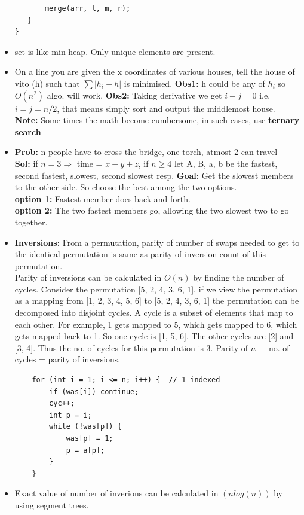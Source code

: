 \documentclass[8pt, a4paper, oneside, twocolumn]{extarticle}
\begin{document}
\begin{itemize}
\begin{verbatim}
       merge(arr, l, m, r);
   }
}
    \end{verbatim}
    \item set is like min heap. Only unique elements are present.
    \item On a line you are given the x coordinates of various houses, tell the house of vito (h) such that $\sum |h_i - h|$ is minimised. \textbf{Obs1: } h could be any of $h_i$ so $O(n^2)$ algo. will work. \textbf{Obs2: } Taking derivative we get $i - j = 0$ i.e. $i = j = n/2$, that means simply sort and output the middlemost house.\\
    \textbf{Note: }Some times the math become cumbersome, in such cases, use \textbf{ternary search}
    \item \textbf{Prob: }n people have to cross the bridge, one torch, atmost 2 can travel\\
    \textbf{Sol: }if $n = 3 \Rightarrow$ time = $x + y + z$, if $n \geq 4$ let A, B, a, b be the fastest, second fastest, slowest, second slowest resp. \textbf{Goal: }Get the slowest members to the other side. So choose the best among the two options.\\\textbf{option 1: }Fastest member does back and forth.\\\textbf{option 2: }The two fastest members go, allowing the two slowest two to go together.
    \item \textbf{Inversions: }From a permutation, parity of number of swaps needed to get to the identical permutation is same as parity of inversion count of this permutation.
    \\Parity of inversions can be calculated in $O(n)$ by finding the number of cycles. Consider the permutation [5, 2, 4, 3, 6, 1], if we view the permutation as a mapping from [1, 2, 3, 4, 5, 6] to [5, 2, 4, 3, 6, 1] the permutation can be decomposed into disjoint cycles. A cycle is a subset of elements that map to each other. For example, 1 gets mapped to 5, which gets mapped to 6, which gets mapped back to 1. So one cycle is [1, 5, 6]. The other cycles are [2] and [3, 4]. Thus the no. of cycles for this permutation is 3. Parity of $n -$ no. of cycles = parity of inversions.
    \begin{verbatim}
    for (int i = 1; i <= n; i++) {  // 1 indexed
        if (was[i]) continue;
        cyc++;
        int p = i;
        while (!was[p]) {
            was[p] = 1;
            p = a[p];
        }
    }
    \end{verbatim}
    \item Exact value of number of inverions can be calculated in $(nlog(n))$ by using segment trees. 

\end{itemize}
\end{document}
